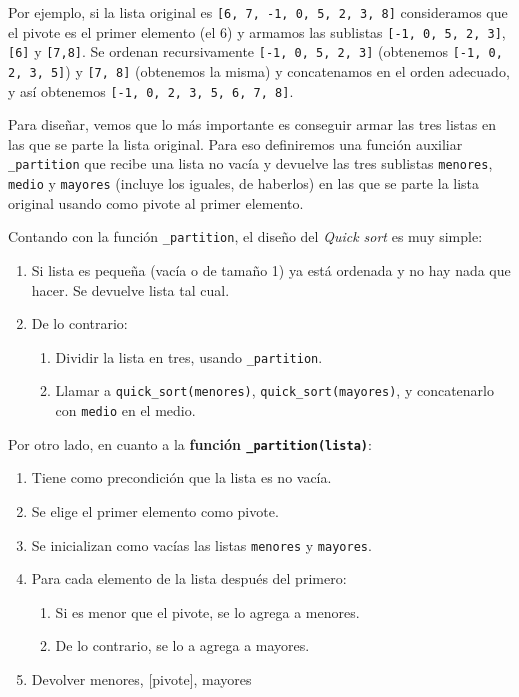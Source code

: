 Por ejemplo, si la lista original es \lstinline+[6, 7, -1, 0, 5, 2, 3, 8]+
consideramos que el pivote es el primer elemento (el 6) y armamos las
sublistas \lstinline+[-1, 0, 5, 2, 3]+, \lstinline+[6]+ y
\lstinline+[7,8]+. Se ordenan recursivamente \lstinline+[-1, 0, 5, 2, 3]+
(obtenemos \lstinline+[-1, 0, 2, 3, 5]+) y \lstinline+[7, 8]+ (obtenemos la
misma) y concatenamos en el orden adecuado, y así obtenemos
\lstinline+[-1, 0, 2, 3, 5, 6, 7, 8]+.

Para diseñar, vemos que lo más importante es conseguir armar las tres
listas en las que se parte la lista original. Para eso definiremos una
función auxiliar \lstinline!_partition! que recibe una lista no vacía y
devuelve las tres sublistas \lstinline!menores!, \lstinline!medio! y
\lstinline!mayores!  (incluye los iguales, de haberlos) en las que se parte
la lista original usando como pivote al primer elemento.

Contando con la función \lstinline!_partition!, el diseño del {\it Quick sort}
es muy simple:

\begin{enumerate}
\item Si lista es pequeña (vacía o de tamaño 1) ya está ordenada y
no hay nada que hacer. Se devuelve lista tal cual.
\item De lo contrario:
\begin{enumerate}
\item Dividir la lista en tres, usando \lstinline!_partition!.
\item Llamar a \lstinline!quick_sort(menores)!,
\lstinline!quick_sort(mayores)!, y concatenarlo con \lstinline!medio! en el
medio.
\end{enumerate}
\end{enumerate}

Por otro lado, en cuanto a la {\bf función \lstinline!_partition(lista)!}:

\begin{enumerate}
\item Tiene como precondición que la lista es no vacía.
\item Se elige el primer elemento como pivote.
\item Se inicializan como vacías las listas \lstinline!menores! y
\lstinline!mayores!.
\item Para cada elemento de la lista después del primero:
\begin{enumerate}
\item Si es menor que el pivote, se lo agrega a menores.
\item De lo contrario, se lo a agrega a mayores.
\end{enumerate}
\item Devolver menores, [pivote], mayores
\end{enumerate}

